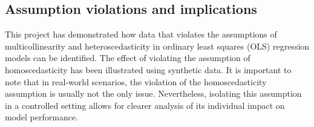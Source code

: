 
\subsection{Assumption violations and implications}
This project has demonstrated how data that violates the assumptions of multicollinearity and heteroscedasticity in ordinary least squares (OLS) regression models can be identified. The effect of violating the assumption of homoscedasticity has been illustrated using synthetic data. It is important to note that in real-world scenarios, the violation of the homoscedasticity assumption is usually not the only issue. Nevertheless, isolating this assumption in a controlled setting allows for clearer analysis of its individual impact on model performance. %

